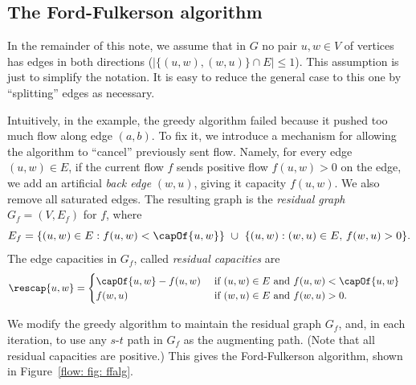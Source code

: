 \subsection{The Ford-Fulkerson algorithm}
In the remainder of this note, we assume that in $G$ no pair $u,w\in V$ of vertices
has edges in both directions ($|\{(u,w),(w,u)\} \cap E| \le 1$).
This assumption is just to simplify the notation.
It is easy to reduce the general case to this one by ``splitting'' edges as necessary.

Intuitively, in the example, the greedy algorithm failed because it pushed too much flow along edge $(a,b)$.
To fix it, we introduce a mechanism for allowing the algorithm to ``cancel'' previously sent flow.
Namely, 
for every edge $(u,w)\in E$,
if the current flow $f$ sends positive flow $f(u,w) > 0$ on the edge,
we add an artificial \emph{back edge} $(w,u)$, giving it capacity $f(u,w)$.
We also remove all saturated edges.
The resulting graph is the \emph{residual graph} $G_f=(V, E_f)$ for $f$,
where \[E_f = \{(u,w)\in E: f(u,w) < \capOf {u,w} \}
  ~\cup~ \{(u,w) : (w,u) \in E,\, f(w,u) > 0 \}.\]
The edge capacities in $G_f$, called \emph{residual capacities} are
\begin{align*}
  \rescap {u,w} &=
                  \begin{cases}
                    \capOf {u,w} - f(u,w) & \text{ if } (u,w)\in E \text{ and } f(u,w) < \capOf{u,w} \\
                    f(w,u) & \text{ if } (w,u)\in E \text{ and } f(w,u) > 0.
                  \end{cases}
\end{align*}

\newpage

We modify the greedy algorithm to maintain the residual graph $G_f$,
and, in each iteration,
to use any $s$-$t$ path in $G_f$ as the augmenting path.
(Note that all residual capacities are positive.)
This gives the Ford-Fulkerson algorithm, shown in Figure~\ref{flow: fig: ffalg}.

